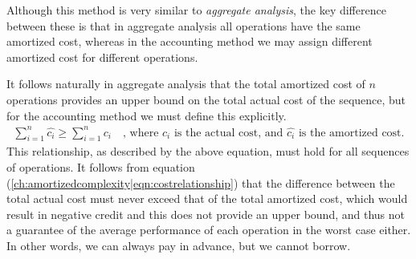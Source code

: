 Although this method is very similar to \textit{aggregate analysis}, the key
difference between these is that in aggregate analysis all operations have
the same amortized cost, whereas in the accounting method we may assign
different amortized cost for different operations.

It follows naturally in aggregate analysis that the total amortized cost of
$n$ operations provides an upper bound on the total actual cost of the
sequence, but for the accounting method we must define this explicitly.
\begin{align}
\label{ch:amortizedcomplexity|eqn:costrelationship}
	\sum_{i=1}^{n}{\hat{c_i}} \geq \sum_{i=1}^{n}{c_i}
	\quad \text{, where }c_i\text{ is the actual cost, and }
	\hat{c_i}\text{ is the amortized cost.}
\end{align}
This relationship, as described by the above equation, must hold for all
sequences of operations. It follows from equation
(\ref{ch:amortizedcomplexity|eqn:costrelationship}) that the difference
between the total actual cost must never exceed that of the total amortized
cost, which would result in negative credit and this does not provide an upper
bound, and thus not a guarantee of the average performance of each operation
in the worst case either. In other words, we can always pay in advance, but
we cannot borrow.

